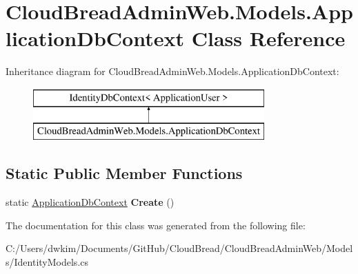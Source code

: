 \hypertarget{class_cloud_bread_admin_web_1_1_models_1_1_application_db_context}{}\section{Cloud\+Bread\+Admin\+Web.\+Models.\+Application\+Db\+Context Class Reference}
\label{class_cloud_bread_admin_web_1_1_models_1_1_application_db_context}
Inheritance diagram for Cloud\+Bread\+Admin\+Web.\+Models.\+Application\+Db\+Context\+:\begin{figure}[H]
\begin{center}
\leavevmode
\includegraphics[height=2.000000cm]{class_cloud_bread_admin_web_1_1_models_1_1_application_db_context}
\end{center}
\end{figure}
\subsection*{Static Public Member Functions}
\begin{DoxyCompactItemize}
\item 
static \hyperlink{class_cloud_bread_admin_web_1_1_models_1_1_application_db_context}{Application\+Db\+Context} {\bfseries Create} ()\hypertarget{class_cloud_bread_admin_web_1_1_models_1_1_application_db_context_ae838c6a49ec5da37448d58c0b7ea9fed}{}\label{class_cloud_bread_admin_web_1_1_models_1_1_application_db_context_ae838c6a49ec5da37448d58c0b7ea9fed}

\end{DoxyCompactItemize}


The documentation for this class was generated from the following file\+:\begin{DoxyCompactItemize}
\item 
C\+:/\+Users/dwkim/\+Documents/\+Git\+Hub/\+Cloud\+Bread/\+Cloud\+Bread\+Admin\+Web/\+Models/Identity\+Models.\+cs\end{DoxyCompactItemize}
